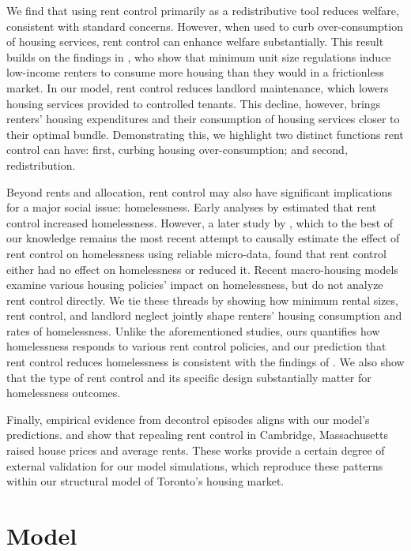 \documentclass[parskip=full]{article}
\begin{document}
We find that using rent control primarily as a redistributive tool reduces welfare, consistent with standard concerns. However, when used to curb over-consumption of housing services, rent control can enhance welfare substantially. This result builds on the findings in \citet{rs-2023}, who show that minimum unit size regulations induce low-income renters to consume more housing than they would in a frictionless market. In our model, rent control reduces landlord maintenance, which lowers housing services provided to controlled tenants. This decline, however, brings renters’ housing expenditures and their consumption of housing services closer to their optimal bundle. Demonstrating this, we highlight two distinct functions rent control can have: first, curbing housing over-consumption; and second, redistribution.

Beyond rents and allocation, rent control may also have significant implications for a major social issue: homelessness. Early analyses by \citet{tucker1987,tucker1989heritage,tucker1991cato,tucker1991public} estimated that rent control increased homelessness. However, a later study by \citet{eo-1998}, which to the best of our knowledge remains the most recent attempt to causally estimate the effect of rent control on homelessness using reliable micro-data, found that rent control either had no effect on homelessness or reduced it. Recent macro-housing models \citep{az-2024,abramson-2024} examine various housing policies' impact on homelessness, but do not analyze rent control directly. We tie these threads by showing how minimum rental sizes, rent control, and landlord neglect jointly shape renters’ housing consumption and rates of homelessness. Unlike the aforementioned studies, ours quantifies how homelessness responds to various rent control policies, and our prediction that rent control reduces homelessness is consistent with the findings of \citet{eo-1998}. We also show that the type of rent control and its specific design substantially matter for homelessness outcomes.

Finally, empirical evidence from decontrol episodes aligns with our model’s predictions. \citet{sims-2007} and \citet{app-2014} show that repealing rent control in Cambridge, Massachusetts raised house prices and average rents. These works provide a certain degree of external validation for our model simulations, which reproduce these patterns within our structural model of Toronto’s housing market.

\section{Model}\label{sec:model}
\end{document}
